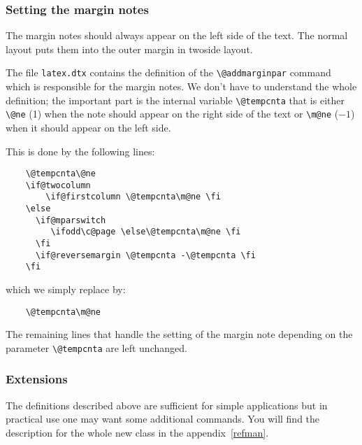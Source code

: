 \documentclass[twoside,a4paper]{refart}
\begin{document}
\subsubsection{Setting the margin notes}

The margin notes should always appear on the left side of the text. 
The normal layout puts them into the outer margin in twoside layout.

The file \texttt{latex.dtx} contains the definition of the 
\verb|\@addmarginpar| command which is responsible for the margin 
notes. We don't have to understand the whole definition; the important 
part is the internal variable \verb|\@tempcnta| that is either 
\verb|\@ne| (1) when the note should appear on the right side of the 
text or \verb|\m@ne| ($-1$) when it should appear on the left side.

This is done by the following lines:
\begin{verbatim}
    \@tempcnta\@ne
    \if@twocolumn
        \if@firstcolumn \@tempcnta\m@ne \fi
    \else
      \if@mparswitch
         \ifodd\c@page \else\@tempcnta\m@ne \fi
      \fi
      \if@reversemargin \@tempcnta -\@tempcnta \fi
    \fi
\end{verbatim}

which we simply replace by:
\begin{verbatim}
    \@tempcnta\m@ne
\end{verbatim}

The remaining lines that handle the setting of the margin note 
depending on the parameter \verb|\@tempcnta| are left unchanged.

\subsubsection{Extensions}

The definitions described above are sufficient for simple applications 
but in practical use one may want some additional commands.  
 You will find the description for the whole new 
class in the appendix~\ref{refman}.





\printindex
\end{document}
